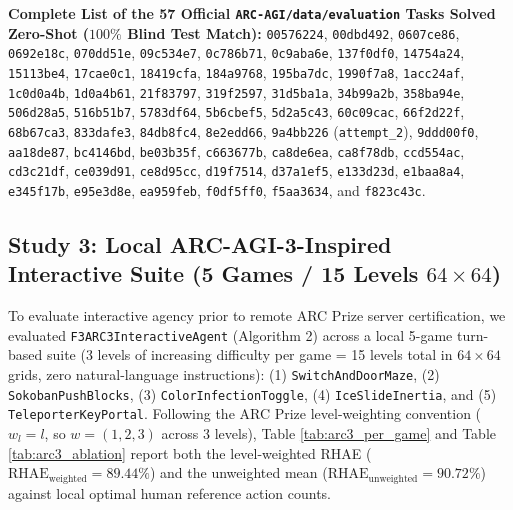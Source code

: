 \documentclass[10pt,a4paper]{article}
\begin{document}
\textbf{Complete List of the 57 Official \texttt{ARC-AGI/data/evaluation} Tasks Solved Zero-Shot ($100\%$ Blind Test Match):}
\texttt{00576224}, \texttt{00dbd492}, \texttt{0607ce86}, \texttt{0692e18c}, \texttt{070dd51e}, \texttt{09c534e7}, \texttt{0c786b71}, \texttt{0c9aba6e}, \texttt{137f0df0}, \texttt{14754a24}, \texttt{15113be4}, \texttt{17cae0c1}, \texttt{18419cfa}, \texttt{184a9768}, \texttt{195ba7dc}, \texttt{1990f7a8}, \texttt{1acc24af}, \texttt{1c0d0a4b}, \texttt{1d0a4b61}, \texttt{21f83797}, \texttt{319f2597}, \texttt{31d5ba1a}, \texttt{34b99a2b}, \texttt{358ba94e}, \texttt{506d28a5}, \texttt{516b51b7}, \texttt{5783df64}, \texttt{5b6cbef5}, \texttt{5d2a5c43}, \texttt{60c09cac}, \texttt{66f2d22f}, \texttt{68b67ca3}, \texttt{833dafe3}, \texttt{84db8fc4}, \texttt{8e2edd66}, \texttt{9a4bb226} (\texttt{attempt\_2}), \texttt{9ddd00f0}, \texttt{aa18de87}, \texttt{bc4146bd}, \texttt{be03b35f}, \texttt{c663677b}, \texttt{ca8de6ea}, \texttt{ca8f78db}, \texttt{ccd554ac}, \texttt{cd3c21df}, \texttt{ce039d91}, \texttt{ce8d95cc}, \texttt{d19f7514}, \texttt{d37a1ef5}, \texttt{e133d23d}, \texttt{e1baa8a4}, \texttt{e345f17b}, \texttt{e95e3d8e}, \texttt{ea959feb}, \texttt{f0df5ff0}, \texttt{f5aa3634}, and \texttt{f823c43c}.

\subsection{Study 3: Local ARC-AGI-3-Inspired Interactive Suite (5 Games / 15 Levels $64\times 64$)}

To evaluate interactive agency prior to remote ARC Prize server certification, we evaluated \texttt{F3ARC3InteractiveAgent} (Algorithm 2) across a local 5-game turn-based suite (3 levels of increasing difficulty per game = 15 levels total in $64\times 64$ grids, zero natural-language instructions): (1) \texttt{SwitchAndDoorMaze}, (2) \texttt{SokobanPushBlocks}, (3) \texttt{ColorInfectionToggle}, (4) \texttt{IceSlideInertia}, and (5) \texttt{TeleporterKeyPortal}. Following the ARC Prize level-weighting convention ($w_l = l$, so $w = (1, 2, 3)$ across 3 levels), Table \ref{tab:arc3_per_game} and Table \ref{tab:arc3_ablation} report both the level-weighted RHAE ($\text{RHAE}_{\text{weighted}} = 89.44\%$) and the unweighted mean ($\text{RHAE}_{\text{unweighted}} = 90.72\%$) against local optimal human reference action counts.
\end{document}
